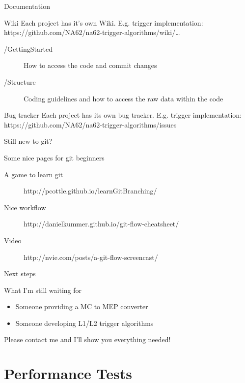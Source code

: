 \begin{frame}{Documentation}{}
		\begin{block}{Wiki}
		Each project has it's own Wiki. E.g. trigger implementation:
		https://github.com/NA62/na62-trigger-algorithms/wiki/\ldots
		\begin{description}
  			\item[/GettingStarted] How to access the code and commit changes
  			
  			\item[/Structure] Coding guidelines and how to access the raw data within
  			the code
		\end{description}
	\end{block}
		
	\begin{block}{Bug tracker}
		Each project has its own bug tracker. E.g. trigger implementation:
		https://github.com/NA62/na62-trigger-algorithms/issues
	\end{block}
\end{frame}

\begin{frame}{Still new to git?}{}
	\begin{block}{Some nice pages for git beginners}
		\begin{description}
  			\item[A game to learn git] http://pcottle.github.io/learnGitBranching/
  			\item[Nice workflow]	http://danielkummer.github.io/git-flow-cheatsheet/
  			\item[Video] http://nvie.com/posts/a-git-flow-screencast/
		\end{description}
	\end{block}
\end{frame}

\begin{frame}{Next steps}{}
	\begin{block}{What I'm still waiting for}
		\begin{itemize}
  			\item Someone providing a MC to MEP converter
  			\item Someone developing L1/L2 trigger algorithms		
		\end{itemize}
	\end{block}
	
	Please contact me and I'll show you everything needed!
\end{frame}

\section*{Performance Tests}

